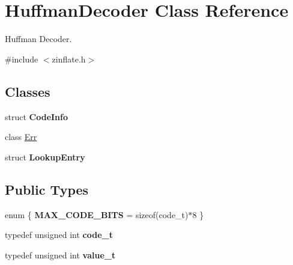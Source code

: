 \hypertarget{class_huffman_decoder}{
\section{HuffmanDecoder Class Reference}
\label{class_huffman_decoder}
}


Huffman Decoder.  


{\ttfamily \#include $<$zinflate.h$>$}\subsection*{Classes}
\begin{DoxyCompactItemize}
\item 
struct {\bfseries CodeInfo}
\item 
class \hyperlink{class_huffman_decoder_1_1_err}{Err}
\item 
struct {\bfseries LookupEntry}
\end{DoxyCompactItemize}
\subsection*{Public Types}
\begin{DoxyCompactItemize}
\item 
enum \{ {\bfseries MAX\_\-CODE\_\-BITS} =  sizeof(code\_\-t)$\ast$8
 \}
\item 
\hypertarget{class_huffman_decoder_a550cd665357c320af58916f992eb8756}{
typedef unsigned int {\bfseries code\_\-t}}
\label{class_huffman_decoder_a550cd665357c320af58916f992eb8756}

\item 
\hypertarget{class_huffman_decoder_aae2c1dc3110a39ae9d74fc00aee8a1ec}{
typedef unsigned int {\bfseries value\_\-t}}
\label{class_huffman_decoder_aae2c1dc3110a39ae9d74fc00aee8a1ec}

\end{DoxyCompactItemize}
